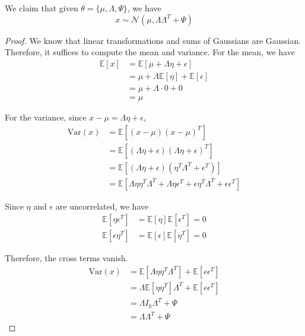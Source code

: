   \begin{lemma}
    We claim that given $\theta = \{\mu, \Lambda, \Psi\}$, we have
    \begin{equation}
      x \sim \mathcal{N}(\mu, \Lambda \Lambda^T + \Psi)
    \end{equation}
  \end{lemma}
  \begin{proof}
    We know that linear transformations and sums of Gaussians are Gaussian. Therefore, it suffices to compute the mean and variance. For the mean, we have 
    \begin{align}
      \mathbb{E}[x] &= \mathbb{E}[\mu + \Lambda \eta + \epsilon] \\
      &= \mu + \Lambda \mathbb{E}[\eta] + \mathbb{E}[\epsilon] \\
      &= \mu + \Lambda \cdot 0 + 0 \\
      &= \mu
    \end{align}

    For the variance, since $x - \mu = \Lambda \eta +  \epsilon$, 
    \begin{align}
      \text{Var}(x) &= \mathbb{E}[(x - \mu)(x - \mu)^T] \\
      &= \mathbb{E}[(\Lambda \eta + \epsilon)(\Lambda \eta + \epsilon)^T] \\
      &= \mathbb{E}[(\Lambda \eta + \epsilon)(\eta^T \Lambda^T + \epsilon^T)] \\
      &= \mathbb{E}[\Lambda \eta \eta^T \Lambda^T + \Lambda \eta  \epsilon^T + \epsilon \eta^T \Lambda^T + \epsilon \epsilon^T ]
    \end{align}
    
    Since $\eta$ and $\epsilon$ are uncorrelated, we have 
    \begin{align}
      \mathbb{E}[\eta \epsilon^T] &= \mathbb{E}[\eta]\mathbb{E}[\epsilon^T] = 0 \\
      \mathbb{E}[\epsilon \eta^T] &= \mathbb{E}[\epsilon]\mathbb{E}[\eta^T] = 0
    \end{align}
    
    Therefore, the cross terms vanish. 
    \begin{align}
      \text{Var}(x) &= \mathbb{E}[\Lambda \eta \eta^T \Lambda^T] + \mathbb{E}[\epsilon \epsilon^T] \\
      &= \Lambda \mathbb{E}[\eta \eta^T] \Lambda^T + \mathbb{E}[\epsilon \epsilon^T] \\ 
      &= \Lambda I_k \Lambda^T + \Psi \\
      &= \Lambda \Lambda^T + \Psi
    \end{align}
  \end{proof}

